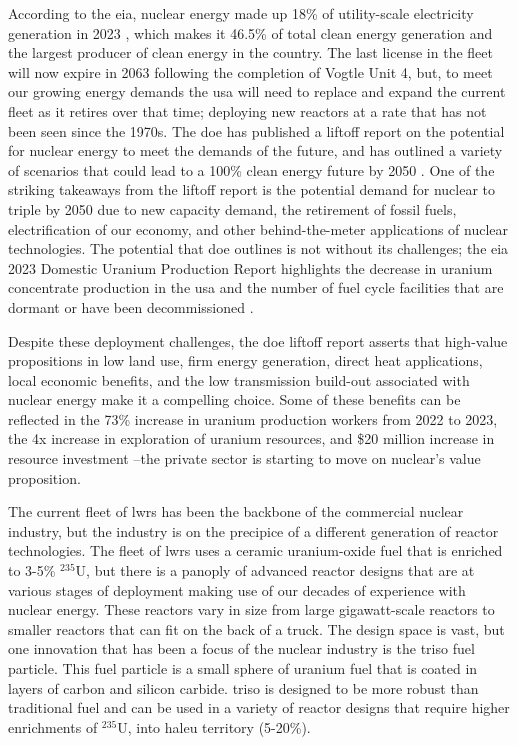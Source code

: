 According to the \gls{eia}, nuclear energy made up 18\% of utility-scale
electricity generation in 2023 \cite{eia_elec_gen_2024}, which makes it 46.5\%
of total clean energy generation and the largest producer of clean energy in
the country. The last license in the fleet will now expire in 2063 following
the completion of Vogtle Unit 4, but, to meet our growing energy demands the
\gls{usa} will need to replace and expand the current fleet as it retires over
that time; deploying new reactors at a rate that has not been seen since the
1970s. The \gls{doe} has published a liftoff report on the potential for
nuclear energy to meet the demands of the future, and has outlined a variety of
scenarios that could lead to a 100\% clean energy future by 2050
\cite{julie_liftoff_pathways_2024}. One of the striking takeaways from the
liftoff report is the potential demand for nuclear to triple by 2050 due to new
capacity demand, the retirement of fossil fuels, electrification of our
economy, and other behind-the-meter applications of nuclear technologies. The
potential that \gls{doe} outlines is not without its challenges; the \gls{eia}
2023 Domestic Uranium Production Report highlights the decrease in uranium
concentrate production in the \gls{usa} and the number of fuel cycle facilities
that are dormant or have been decommissioned \cite{eia_uranium_statistics_2023}.

Despite these deployment challenges, the \gls{doe} liftoff report asserts that
high-value propositions in low land use, firm energy generation, direct heat
applications, local economic benefits, and the low transmission build-out
associated with nuclear energy make it a compelling choice. Some of these
benefits can be reflected in the 73\% increase in uranium production workers
from 2022 to 2023, the 4x increase in exploration of uranium resources, and
\$20 million increase in resource investment \cite{eia_uranium_statistics_2023}
--the private sector is starting to move on nuclear's value proposition.

The current fleet of \glspl{lwr} has been the backbone of the commercial nuclear
industry, but the industry is on the precipice of a different generation of
reactor technologies. The fleet of \glspl{lwr} uses a ceramic uranium-oxide fuel
that is enriched to 3-5\% $^{235}$U, but there is a panoply of advanced reactor
designs that are at various stages of deployment making use of our decades of
experience with nuclear energy. These reactors vary in size from large
gigawatt-scale reactors to smaller reactors that can fit on the back of a
truck. The design space is vast, but one innovation that has been a focus of
the nuclear industry is the \gls{triso} fuel particle. This fuel particle is a
small sphere of uranium fuel that is coated in layers of carbon and silicon
carbide. \gls{triso} is designed to be more robust than traditional fuel and
can be used in a variety of reactor designs that require higher enrichments of
$^{235}$U, into \gls{haleu} territory (5-20\%).

